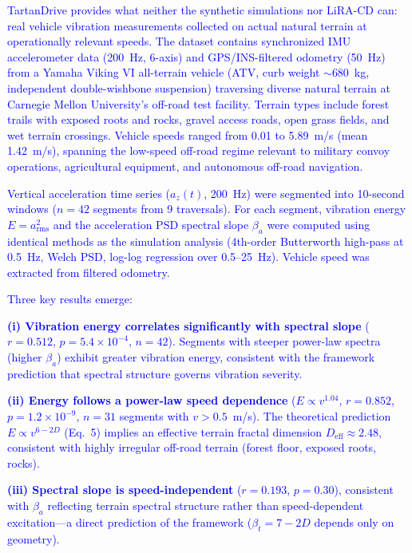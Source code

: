 \documentclass[11pt]{article}
\begin{document}
\textcolor{blue}{TartanDrive provides what neither the synthetic simulations nor LiRA-CD can: real vehicle vibration measurements collected on actual natural terrain at operationally relevant speeds. The dataset contains synchronized IMU accelerometer data (200~Hz, 6-axis) and GPS/INS-filtered odometry (50~Hz) from a Yamaha Viking VI all-terrain vehicle (ATV, curb weight $\sim$680~kg, independent double-wishbone suspension) traversing diverse natural terrain at Carnegie Mellon University's off-road test facility. Terrain types include forest trails with exposed roots and rocks, gravel access roads, open grass fields, and wet terrain crossings. Vehicle speeds ranged from 0.01 to 5.89~m/s (mean 1.42~m/s), spanning the low-speed off-road regime relevant to military convoy operations, agricultural equipment, and autonomous off-road navigation.}

\textcolor{blue}{Vertical acceleration time series ($a_z(t)$, 200~Hz) were segmented into 10-second windows ($n = 42$ segments from 9 traversals). For each segment, vibration energy $E = a_{\mathrm{rms}}^2$ and the acceleration PSD spectral slope $\beta_a$ were computed using identical methods as the simulation analysis (4th-order Butterworth high-pass at 0.5~Hz, Welch PSD, log-log regression over 0.5--25~Hz). Vehicle speed was extracted from filtered odometry.}

\textcolor{blue}{Three key results emerge:}

\textcolor{blue}{\textbf{(i) Vibration energy correlates significantly with spectral slope} ($r = 0.512$, $p = 5.4 \times 10^{-4}$, $n = 42$). Segments with steeper power-law spectra (higher $\beta_a$) exhibit greater vibration energy, consistent with the framework prediction that spectral structure governs vibration severity.}

\textcolor{blue}{\textbf{(ii) Energy follows a power-law speed dependence} ($E \propto v^{1.04}$, $r = 0.852$, $p = 1.2 \times 10^{-9}$, $n = 31$ segments with $v > 0.5$~m/s). The theoretical prediction $E \propto v^{6-2D}$ (Eq.~5) implies an effective terrain fractal dimension $D_{\mathrm{eff}} \approx 2.48$, consistent with highly irregular off-road terrain (forest floor, exposed roots, rocks).}

\textcolor{blue}{\textbf{(iii) Spectral slope is speed-independent} ($r = 0.193$, $p = 0.30$), consistent with $\beta_a$ reflecting terrain spectral structure rather than speed-dependent excitation---a direct prediction of the framework ($\beta_t = 7-2D$ depends only on geometry).}
\end{document}
